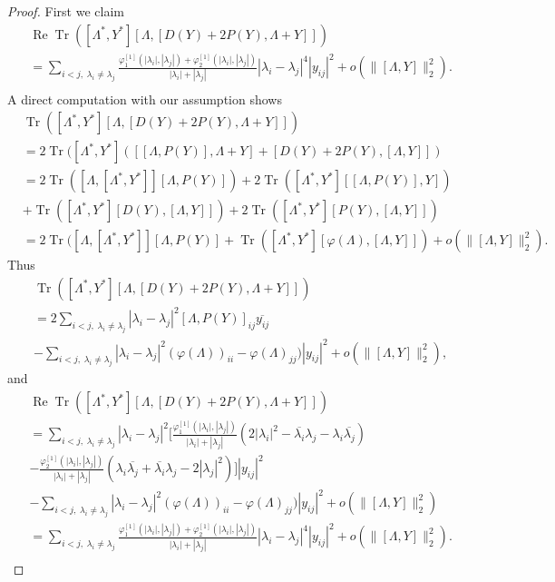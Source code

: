 \documentclass[12pt]{article}
\theoremstyle{definition}
\numberwithin{equation}{section}
\DeclareMathOperator{\Tr}{Tr}
\renewcommand{\Re}{\operatorname{Re}}
\begin{document}
\begin{proof} First we claim 
\begin{align*}
	&\Re \Tr([\Lambda^*,Y^*][\Lambda,[D(Y)+2P(Y), \Lambda+Y]])  \\
	&=\sum_{i<j,\;\lambda_i\neq \lambda_j}
	\frac{\varphi^{[1]}_1(|\lambda_i|,|\lambda_j|)+\varphi^{[1]}_2(|\lambda_i|,|\lambda_j|)}{|\lambda_i|+|\lambda_j|}
	|\lambda_i-\lambda_j|^4|y_{ij}|^2+o(\|[\Lambda,Y]\|_2^2).\\
\end{align*}
A direct computation with our assumption shows 
\begin{align*}
	 &\Tr([\Lambda^*,Y^*][\Lambda,[D(Y)+2P(Y), \Lambda+Y]])  \\
	& =2\Tr([\Lambda^*,Y^*]([[\Lambda,P(Y)], \Lambda+Y]+
[D(Y)+2P(Y), [\Lambda,Y]]	)\\
&=2\Tr([\Lambda,[\Lambda^*,Y^*]][\Lambda,P(Y)])+2\Tr([\Lambda^*,Y^*][[\Lambda,P(Y)],Y])\\
&+\Tr([\Lambda^*,Y^*][D(Y),[\Lambda,Y]])+
2\Tr([\Lambda^*,Y^*][P(Y),[\Lambda,Y]])\\
&=2\Tr([\Lambda,[\Lambda^*,Y^*]][\Lambda,P(Y)]+\Tr([\Lambda^*,Y^*][\varphi(\Lambda),[\Lambda,Y]])+o(\|[\Lambda,Y]\|_2^2). 
\end{align*}
Thus 
\begin{align*}
	 & \Tr([\Lambda^*,Y^*][\Lambda,[D(Y)+2P(Y), \Lambda+Y]])  \\
	& =2\sum_{i<j,\;\lambda_i\neq \lambda_j}|\lambda_i-\lambda_j|^2[\Lambda, P(Y)]_{ij}\overline{y_{ij}}\\
	&-\sum_{i<j,\;\lambda_i\neq \lambda_j}|\lambda_i-\lambda_j|^2(\varphi(\Lambda))_{ii}-\varphi(\Lambda)_{jj})|y_{ij}|^2
	+o(\|[\Lambda,Y]\|_2^2),
\end{align*}
and 
\begin{align*}
	&\Re \Tr([\Lambda^*,Y^*][\Lambda,[D(Y)+2P(Y), \Lambda+Y]])  \\
	& =\sum_{i<j,\;\lambda_i\neq \lambda_j}|\lambda_i-\lambda_j|^2
	[  \frac{\varphi^{[1]}_1(|\lambda_i|,|\lambda_j|)}{|\lambda_i|+|\lambda_j|}
	(2|\lambda_i|^2-\overline{\lambda_i}\lambda_j-\lambda_i\overline{\lambda_j})\\
	&-\frac{\varphi^{[1]}_2(|\lambda_i|,|\lambda_j|)}{|\lambda_i|+|\lambda_j|}
	(\lambda_i\overline{\lambda_j}+\overline{\lambda_i}\lambda_j-2|\lambda_j|^2)	 
	]|y_{ij}|^2\\
	&-\sum_{i<j,\;\lambda_i\neq \lambda_j}|\lambda_i-\lambda_j|^2(\varphi(\Lambda))_{ii}-\varphi(\Lambda)_{jj})|y_{ij}|^2+o(\|[\Lambda,Y]\|_2^2)\\
	&=\sum_{i<j,\;\lambda_i\neq \lambda_j}
	\frac{\varphi^{[1]}_1(|\lambda_i|,|\lambda_j|)+\varphi^{[1]}_2(|\lambda_i|,|\lambda_j|)}{|\lambda_i|+|\lambda_j|}
	|\lambda_i-\lambda_j|^4|y_{ij}|^2+o(\|[\Lambda,Y]\|_2^2).\\
\end{align*}


\end{proof}
\end{document}
